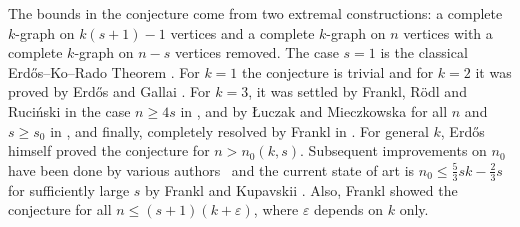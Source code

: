 \documentclass[11pt, reqno]{amsart}    	%
\theoremstyle{definition}
\numberwithin{equation}{section}
\begin{document}
	The bounds in the conjecture come from two extremal constructions: a complete $k$-graph on $k(s+1)-1$ vertices and a  complete $k$-graph on $n$ vertices with a complete $k$-graph on $n-s$ vertices removed.
	The case $ s=1 $ is the classical Erd\H os--Ko--Rado Theorem \cite{Erd1974Intersection}. For $ k = 1 $ the conjecture is trivial and for $ k = 2 $ it was proved by Erd\H os and Gallai \cite{1959On}. For $ k = 3 $, it was settled by Frankl,  R\"odl and Ruci\'nski in the case $ n \ge4s $ in \cite{2012On},  and by  \L uczak and Mieczkowska for all $ n $ and $ s \ge s_0 $ in \cite{Tomasz2014On}, and finally, completely resolved by Frankl in \cite{Frankl2017On}. 
	For general $ k$, Erd\H os \cite{MR260599} himself proved the conjecture for $ n>n_{0}(k,s) $.
	Subsequent improvements on $n_0$ have been done by various authors~\cite{BOLLOB1976SETS,2012The,2013Improved,0THE} and the current state of art is $ n_0\le \frac{5}{3}sk-\frac{2}{3}s $ for sufficiently large $ s$ by Frankl and Kupavskii \cite{0THE}. Also, Frankl \cite{Frankl2017Proof} showed the conjecture for all $ n\le(s+1)(k+\varepsilon) $, where $ \varepsilon $ depends on $ k $ only.
	
	
\end{document}
